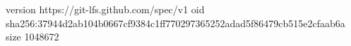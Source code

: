 version https://git-lfs.github.com/spec/v1
oid sha256:37944d2ab104b0667cf9384c1ff770297365252adad5f86479cb515e2cfaab6a
size 1048672
